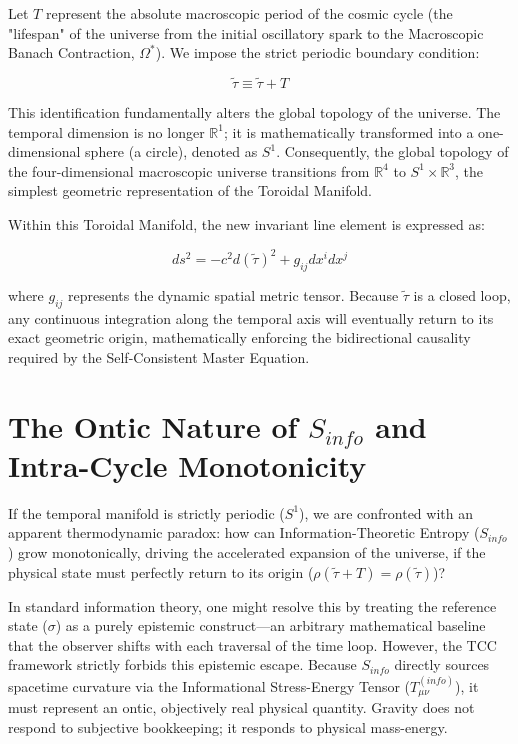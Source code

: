 \documentclass[12pt,openany]{book}
\theoremstyle{plain}
\theoremstyle{definition}
\theoremstyle{remark}
\begin{document}
Let $T$ represent the absolute macroscopic period of the cosmic cycle (the "lifespan" of the universe from the initial oscillatory spark to the Macroscopic Banach Contraction, $\Omega^*$). We impose the strict periodic boundary condition:

\begin{equation}
\tilde{\tau} \equiv \tilde{\tau} + T
\end{equation}

This identification fundamentally alters the global topology of the universe. The temporal dimension is no longer $\mathbb{R}^1$; it is mathematically transformed into a one-dimensional sphere (a circle), denoted as $S^1$. Consequently, the global topology of the four-dimensional macroscopic universe transitions from $\mathbb{R}^4$ to $S^1 \times \mathbb{R}^3$, the simplest geometric representation of the Toroidal Manifold.

Within this Toroidal Manifold, the new invariant line element is expressed as:

\begin{equation}
ds^2 = -c^2d(\tilde{\tau})^2 + g_{ij}dx^i dx^j
\end{equation}

where $g_{ij}$ represents the dynamic spatial metric tensor. Because $\tilde{\tau}$ is a closed loop, any continuous integration along the temporal axis will eventually return to its exact geometric origin, mathematically enforcing the bidirectional causality required by the Self-Consistent Master Equation.

\section{The Ontic Nature of $S_{info}$ and Intra-Cycle Monotonicity}
If the temporal manifold is strictly periodic ($S^1$), we are confronted with an apparent thermodynamic paradox: how can Information-Theoretic Entropy ($S_{info}$) grow monotonically, driving the accelerated expansion of the universe, if the physical state must perfectly return to its origin ($\rho(\tilde{\tau} + T) = \rho(\tilde{\tau})$)?

In standard information theory, one might resolve this by treating the reference state ($\sigma$) as a purely epistemic construct---an arbitrary mathematical baseline that the observer shifts with each traversal of the time loop. However, the TCC framework strictly forbids this epistemic escape. Because $S_{info}$ directly sources spacetime curvature via the Informational Stress-Energy Tensor ($T_{\mu\nu}^{(info)}$), it must represent an ontic, objectively real physical quantity. Gravity does not respond to subjective bookkeeping; it responds to physical mass-energy.
\end{document}
